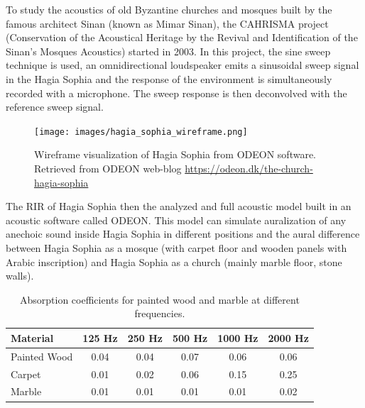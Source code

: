             To study the acoustics of old Byzantine churches and mosques built by the famous architect Sinan (known as Mimar Sinan), the CAHRISMA project (Conservation of the Acoustical Heritage by the Revival and Identification of the Sinan’s Mosques Acoustics) started in 2003\cite{Hagia_Sophia_Multisensory_Aestethics}. In this project, the sine sweep technique is used, an omnidirectional loudspeaker emits a sinusoidal sweep signal in the Hagia Sophia and the response of the environment is simultaneously recorded with a microphone. The sweep response is then deconvolved with the reference sweep signal\cite{Odeon_Hagia_Sophia}.\par

            \begin{figure}[H]
                \centering
                \texttt{[image: images/hagia\_sophia\_wireframe.png]}
                \caption{Wireframe visualization of Hagia Sophia from ODEON software. Retrieved from ODEON web-blog \url{https://odeon.dk/the-church-hagia-sophia}}
                \label{fig:HS_WIREFRAME}
            \end{figure} 

            The RIR of Hagia Sophia then the analyzed and full acoustic model built in an acoustic software called ODEON\cite{Odeon_Hagia_Sophia}. This model can simulate auralization of any anechoic sound inside Hagia Sophia in different positions and the aural difference between Hagia Sophia as a mosque (with carpet floor and wooden panels with Arabic inscription) and Hagia Sophia as a church (mainly marble floor, stone walls)\cite{Revived_Acoustical_History_of_Hagia_Sophia}.\par

            \begin{table}[h!]
                \centering
                \begin{tabular}{|l|c|c|c|c|c|}
                \hline
                Material & 125 Hz & 250 Hz & 500 Hz & 1000 Hz & 2000 Hz \\
                \hline
                Painted Wood & 0.04 & 0.04 & 0.07 & 0.06 & 0.06 \\
                Carpet       & 0.01 & 0.02 & 0.06 & 0.15 & 0.25 \\
                Marble       & 0.01 & 0.01 & 0.01 & 0.01 & 0.02 \\
                \hline
                \end{tabular}
                \caption{Absorption coefficients for painted wood and marble at different frequencies\cite{Absoption_Coefficient_Table}.}
                \label{tab:COEFF}
            \end{table}

